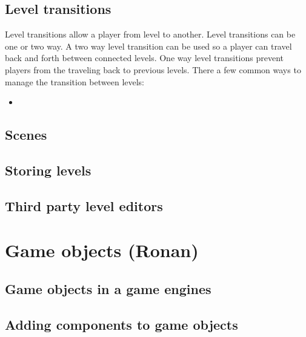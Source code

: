 \documentclass{article} %
\begin{document}
\subsection{Level transitions}
Level transitions allow a player from level to another.
Level transitions can be one or two way.
A two way level transition can be used so a player can travel back and forth between connected levels.
One way level transitions prevent players from the traveling back to previous levels.
There a few common ways to manage the transition between levels:
\begin {itemize}
	\item
\end{itemize}
\subsection{Scenes}
\subsection{Storing levels}
\subsection{Third party level editors}

\section{Game objects (Ronan)}
\subsection{Game objects in a game engines}
\subsection{Adding components to game objects}

\newpage
\end{document}
